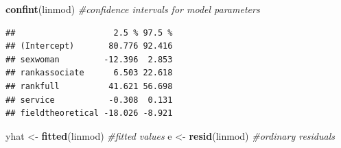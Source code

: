 \documentclass[
  11pt,
  letterpaper,
]{book}
\newenvironment{Shaded}{\begin{snugshade}}{\end{snugshade}}
\newcommand{\CommentTok}[1]{\textcolor[rgb]{0.56,0.35,0.01}{\textit{#1}}}
\newcommand{\KeywordTok}[1]{\textcolor[rgb]{0.13,0.29,0.53}{\textbf{#1}}}
\newcommand{\NormalTok}[1]{#1}
\newcommand{\StringTok}[1]{\textcolor[rgb]{0.31,0.60,0.02}{#1}}
\theoremstyle{definition}
\theoremstyle{definition}
\theoremstyle{definition}
\theoremstyle{remark}
\begin{document}
\begin{Shaded}
\begin{Highlighting}[]
\KeywordTok{confint}\NormalTok{(linmod) }\CommentTok{\#confidence intervals for model parameters}
\end{Highlighting}
\end{Shaded}

\begin{verbatim}
##                    2.5 % 97.5 %
## (Intercept)       80.776 92.416
## sexwoman         -12.396  2.853
## rankassociate      6.503 22.618
## rankfull          41.621 56.698
## service           -0.308  0.131
## fieldtheoretical -18.026 -8.921
\end{verbatim}

\begin{Shaded}
\begin{Highlighting}[]
\NormalTok{yhat \textless{}{-}}\StringTok{ }\KeywordTok{fitted}\NormalTok{(linmod) }\CommentTok{\#fitted values}
\NormalTok{e \textless{}{-}}\StringTok{ }\KeywordTok{resid}\NormalTok{(linmod) }\CommentTok{\#ordinary residuals}
\end{Highlighting}
\end{Shaded}


  
\end{document}
